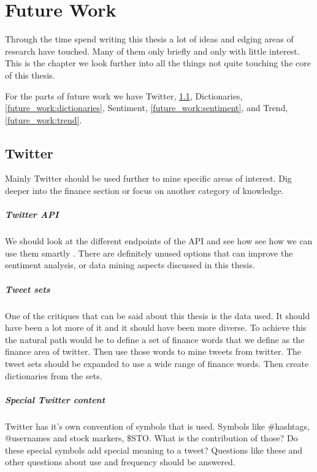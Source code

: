 \chapter{Future Work}\label{future_work}
Through the time spend writing this thesis a lot of ideas and edging areas of
research have touched. Many of them only briefly and only with little interest.
This is the chapter we look further into all the things not quite touching the
core of this thesis.   

For the parts of future work we have Twitter, \ref{future_work:twitter},
Dictionaries, \ref{future_work:dictionaries}, Sentiment,
\ref{future_work:sentiment}, and Trend, \ref{future_work:trend}.
%

\section{Twitter}\label{future_work:twitter}
Mainly Twitter should be used further to mine specific areas of interest. Dig
deeper into the finance section or focus on another category of knowledge.

\paragraph{Twitter API}
We should look at the different endpoints of the API and see how see how we can
use them smartly .
There are definitely unused options that can improve the sentiment analysis, or
data mining aspects discussed in this thesis. 

\paragraph{Tweet sets}
One of the critiques that can be said about this thesis is the data used. It
should have been a lot more of it and it should have been more diverse. To
achieve this the natural path would be to define a set of finance words that we
define as the finance area of twitter. Then use those words to mine tweets from
twitter. The tweet sets should be expanded to use a wide range of finance words.
Then create dictionaries from the sets. 

\paragraph{Special Twitter content}
Twitter has it's own convention of symbols that is used. Symbols like \#hashtags,
@usernames and stock markers, \$STO. What is the contribution of those? Do these
special symbols add special meaning to a tweet? Questions like these and other
questions about use and frequency should be answered. 

